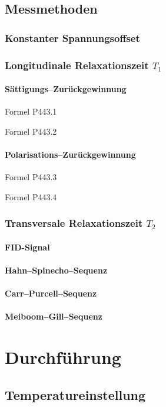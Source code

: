 \section{Messmethoden}
\subsection{Konstanter Spannungsoffset}
\subsection{Longitudinale Relaxationszeit $T_1$}
\subsubsection{Sättigungs–Zurückgewinnung}

Formel P443.1

Formel P443.2

\subsubsection{Polarisations–Zurückgewinnung}

Formel P443.3

Formel P443.4

\subsection{Transversale Relaxationszeit $T_2$}
\subsubsection{FID-Signal}
\subsubsection{Hahn–Spinecho–Sequenz}
\subsubsection{Carr–Purcell–Sequenz}
\subsubsection{Meiboom–Gill–Sequenz}

\chapter{Durchführung}
\section{Temperatureinstellung}

